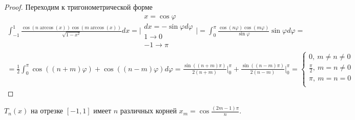 \begin{proof}
  Переходим к тригонометрической форме
  \begin{multline*}
    \int_{-1}^{1}\frac{\cos(n\arccos(x))\cos(m\arccos(x))}{\sqrt{1-x^2}}dx
    =\Big|\substack{x=\cos\varphi \\
      dx = -\sin\varphi d\varphi\\
      1\rightarrow0 \\
      -1\rightarrow\pi
    }\Big|=\int_{0}^{\pi}\frac{\cos(n\varphi)\cos(m\varphi)}{\sin\varphi}\sin\varphi d\varphi = \\
    = \frac{1}{2}\int_0^{\pi}\cos((n+m)\varphi)+\cos((n-m)\varphi)d\varphi = \frac{\sin((n+m)\pi)}{2(n+m)}\Big|_0^{\pi}+\frac{\sin((n-m)\pi)}{2(n-m)}\Big|_0^{\pi}=\begin{cases}
      0,\ m\neq n\neq0         \\
      \frac{\pi}{2},\ m=n\neq0 \\
      \pi,\ m=n=0              \\
    \end{cases}
  \end{multline*}
\end{proof}


\def\SingleImageScale {1.3}

\begin{theorem}
  $T_n(x)$ на отрезке $[-1,1]$ имеет $n$ различных корней $x_m=\cos\frac{(2m-1)\pi}{n}$.
\end{theorem}

